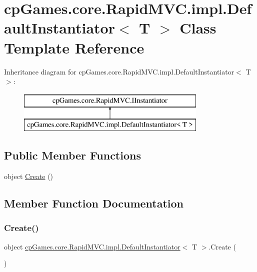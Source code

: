 \hypertarget{classcp_games_1_1core_1_1_rapid_m_v_c_1_1impl_1_1_default_instantiator}{}\section{cp\+Games.\+core.\+Rapid\+M\+V\+C.\+impl.\+Default\+Instantiator$<$ T $>$ Class Template Reference}
\label{classcp_games_1_1core_1_1_rapid_m_v_c_1_1impl_1_1_default_instantiator}
Inheritance diagram for cp\+Games.\+core.\+Rapid\+M\+V\+C.\+impl.\+Default\+Instantiator$<$ T $>$\+:\begin{figure}[H]
\begin{center}
\leavevmode
\includegraphics[height=2.000000cm]{classcp_games_1_1core_1_1_rapid_m_v_c_1_1impl_1_1_default_instantiator}
\end{center}
\end{figure}
\subsection*{Public Member Functions}
\begin{DoxyCompactItemize}
\item 
object \mbox{\hyperlink{classcp_games_1_1core_1_1_rapid_m_v_c_1_1impl_1_1_default_instantiator_ab2c79e24d96f9e860666b5aee6e07548}{Create}} ()
\end{DoxyCompactItemize}


\subsection{Member Function Documentation}
\mbox{\label{classcp_games_1_1core_1_1_rapid_m_v_c_1_1impl_1_1_default_instantiator_ab2c79e24d96f9e860666b5aee6e07548}} 
\subsubsection{\texorpdfstring{Create()}{Create()}}
{\footnotesize\ttfamily object \mbox{\hyperlink{classcp_games_1_1core_1_1_rapid_m_v_c_1_1impl_1_1_default_instantiator}{cp\+Games.\+core.\+Rapid\+M\+V\+C.\+impl.\+Default\+Instantiator}}$<$ T $>$.Create (\begin{DoxyParamCaption}{ }\end{DoxyParamCaption})}



